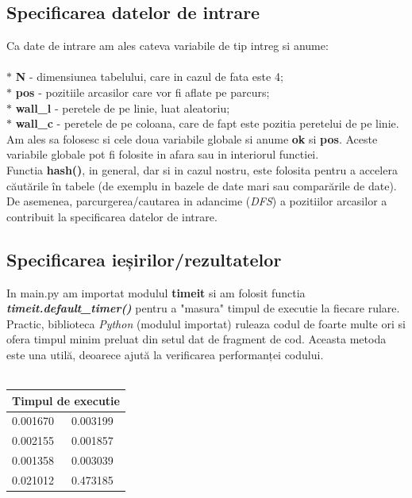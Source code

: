\documentclass{article}
\begin{document}
\subsection{Specificarea datelor de intrare}

\hspace{0.5cm}Ca date de intrare am ales cateva variabile de tip intreg si anume: \\\\ 
$\ast$ \textbf{N} - dimensiunea tabelului, care in cazul de fata este 4; \\
$\ast$ \textbf{pos} - pozitiile arcasilor care vor fi aflate pe parcurs; \\
$\ast$ \textbf{wall\_l} - peretele de pe linie, luat aleatoriu; \\
$\ast$ \textbf{wall\_c} - peretele de pe coloana, care de fapt este pozitia peretelui de pe linie. \\

Am ales sa folosesc si cele doua variabile globale si anume \textbf{ok} si \textbf{pos}. Aceste variabile globale pot fi folosite in afara sau in interiorul functiei. \\ 

Functia \textbf{hash()}, in general, dar si in cazul nostru, este folosita pentru a accelera căutările în tabele (de exemplu in bazele de date mari sau comparările de date). \\ 

De asemenea, parcurgerea/cautarea in adancime (\textit{DFS}) a pozitiilor arcasilor a contribuit la specificarea datelor de intrare. \\


\subsection{Specificarea ieșirilor/rezultatelor}

\hspace{0.6cm} In main.py am importat modulul \textbf{timeit} si am folosit functia \textbf{\textit{timeit.default\_timer()}} pentru a "masura" timpul de executie la fiecare  rulare. Practic, biblioteca \textit{Python} (modulul importat) ruleaza codul de foarte multe ori si ofera timpul minim preluat din setul dat de fragment de cod. Aceasta metoda este una utilă, deoarece ajută la verificarea performanței codului. \\\\

\begin{center}
\begin{tabular}{ |p{2.5cm}||p{3cm}|  }
 \hline
 \multicolumn{2}{|c|}{Timpul de executie } \\
 \hline
 0.001670        &  0.003199 \\
 \hline
0.002155       & 0.001857 \\
\hline
0.001358 & 0.003039 \\
\hline
0.021012 & 0.473185 \\
 \hline
\hline
\end{tabular}
\end{center}
\end{document}
